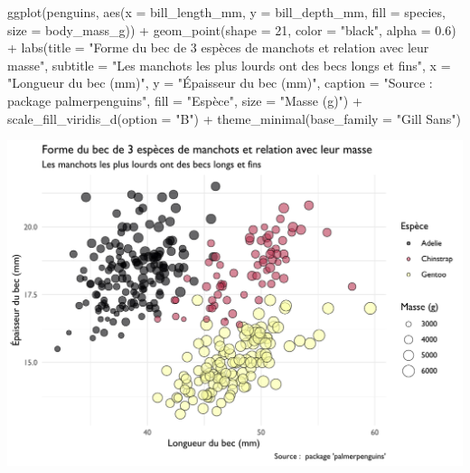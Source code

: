 \documentclass[
  a4paper,
  DIV=11,
  numbers=noendperiod,
  oneside]{scrreprt}
\newenvironment{Shaded}{}{}
\newcommand{\AttributeTok}[1]{\textcolor[rgb]{0.84,0.23,0.29}{#1}}
\newcommand{\DecValTok}[1]{\textcolor[rgb]{0.00,0.36,0.77}{#1}}
\newcommand{\FloatTok}[1]{\textcolor[rgb]{0.00,0.36,0.77}{#1}}
\newcommand{\FunctionTok}[1]{\textcolor[rgb]{0.44,0.26,0.76}{#1}}
\newcommand{\NormalTok}[1]{\textcolor[rgb]{0.14,0.16,0.18}{#1}}
\newcommand{\SpecialCharTok}[1]{\textcolor[rgb]{0.00,0.36,0.77}{#1}}
\newcommand{\StringTok}[1]{\textcolor[rgb]{0.01,0.18,0.38}{#1}}
\begin{document}
\begin{Shaded}
\begin{Highlighting}[]
\FunctionTok{ggplot}\NormalTok{(penguins, }\FunctionTok{aes}\NormalTok{(}\AttributeTok{x =}\NormalTok{ bill\_length\_mm, }\AttributeTok{y =}\NormalTok{ bill\_depth\_mm,}
                     \AttributeTok{fill =}\NormalTok{ species, }\AttributeTok{size =}\NormalTok{ body\_mass\_g)) }\SpecialCharTok{+}
  \FunctionTok{geom\_point}\NormalTok{(}\AttributeTok{shape =} \DecValTok{21}\NormalTok{, }\AttributeTok{color =} \StringTok{"black"}\NormalTok{, }\AttributeTok{alpha =} \FloatTok{0.6}\NormalTok{) }\SpecialCharTok{+}
  \FunctionTok{labs}\NormalTok{(}\AttributeTok{title =} \StringTok{"Forme du bec de 3 espèces de manchots et relation avec leur masse"}\NormalTok{,}
       \AttributeTok{subtitle =} \StringTok{"Les manchots les plus lourds ont des becs longs et fins"}\NormalTok{,}
       \AttributeTok{x =} \StringTok{"Longueur du bec (mm)"}\NormalTok{,}
       \AttributeTok{y =} \StringTok{"Épaisseur du bec (mm)"}\NormalTok{,}
       \AttributeTok{caption =} \StringTok{"Source :  package \textquotesingle{}palmerpenguins\textquotesingle{}"}\NormalTok{,}
       \AttributeTok{fill =} \StringTok{"Espèce"}\NormalTok{,}
       \AttributeTok{size =} \StringTok{"Masse (g)"}\NormalTok{) }\SpecialCharTok{+}
  \FunctionTok{scale\_fill\_viridis\_d}\NormalTok{(}\AttributeTok{option =} \StringTok{"B"}\NormalTok{) }\SpecialCharTok{+}
  \FunctionTok{theme\_minimal}\NormalTok{(}\AttributeTok{base\_family =} \StringTok{"Gill Sans"}\NormalTok{)}
\end{Highlighting}
\end{Shaded}

\includegraphics{images/fonts1.pdf}
\end{document}
